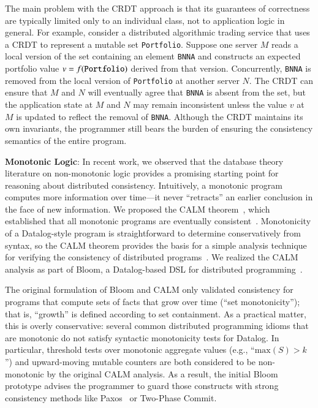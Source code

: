 The main problem with the CRDT approach is that its guarantees of correctness are typically limited only to an individual class, not to application logic in general. For example, consider a distributed algorithmic trading service that uses a CRDT to represent a mutable set \texttt{Portfolio}. Suppose one server $M$ reads a local version of the set containing an element \texttt{BNNA} and constructs an expected portfolio value $v = f(\mbox{\texttt{Portfolio}})$ derived from that version. Concurrently, \texttt{BNNA} is removed from the local version of \texttt{Portfolio} at another server $N$. The CRDT can ensure that $M$ and $N$ will eventually agree that \texttt{BNNA} is absent from the set, but the application state at $M$ and $N$ may remain inconsistent unless the value $v$ at $M$ is updated to reflect the removal of \texttt{BNNA}. Although the CRDT maintains its own invariants, the programmer still bears the burden of ensuring the consistency semantics of the entire program.

\vspace{0.5em}
\noindent \textbf{Monotonic Logic}: In recent work, we observed that the database theory literature on non-monotonic logic provides a promising starting point for reasoning about distributed consistency. Intuitively, a monotonic program computes more information over time---it never ``retracts'' an earlier conclusion in the face of new information. We proposed the CALM theorem~\cite{Hellerstein2010}, which established that all monotonic programs are eventually consistent~\cite{Ameloot2011}. Monotonicity of a Datalog-style program is straightforward to determine conservatively from syntax, so the CALM theorem provides the basis for a simple analysis technique for verifying the consistency of distributed programs~\cite{Alvaro2011}. We realized the CALM analysis as part of Bloom, a Datalog-based DSL for distributed programming~\cite{bloom}.

The original formulation of Bloom and CALM only validated consistency for programs that compute sets of facts that grow over time (``set monotonicity''); that is, ``growth'' is defined according to set containment. As a practical matter, this is overly conservative: several common distributed programming idioms that are monotonic do not satisfy syntactic monotonicity tests for Datalog. In particular, threshold tests over monotonic aggregate values (e.g., ``$\mathrm{max}(S) > k$'') and upward-moving mutable counters are both considered to be non-monotonic by the original CALM analysis.  As a result, the initial Bloom prototype advises the programmer to guard those constructs with strong consistency methods like Paxos~\cite{Lamport1998} or Two-Phase Commit. 

